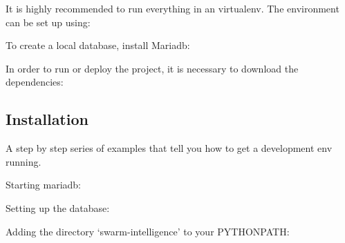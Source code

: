 \documentclass[letterpaper,10pt,english]{sphinxmanual}
\begin{document}
It is highly recommended to run everything in an virtualenv. The environment can be set up using:

\begin{sphinxVerbatim}[commandchars=\\\{\}]
     
\end{sphinxVerbatim}

To create a local database, install Mariadb:

\begin{sphinxVerbatim}[commandchars=\\\{\}]
  
\end{sphinxVerbatim}

In order to run or deploy the project, it is necessary to download the dependencies:

\begin{sphinxVerbatim}[commandchars=\\\{\}]
   
\end{sphinxVerbatim}


\subsection{Installation}
\label{\detokenize{installation:id1}}
A step by step series of examples that tell you how to get a development env running.

Starting mariadb:

\begin{sphinxVerbatim}[commandchars=\\\{\}]
  
\end{sphinxVerbatim}

Setting up the database:

\begin{sphinxVerbatim}[commandchars=\\\{\}]
    
\end{sphinxVerbatim}

Adding the directory `swarm-intelligence' to your PYTHONPATH:
\end{document}
